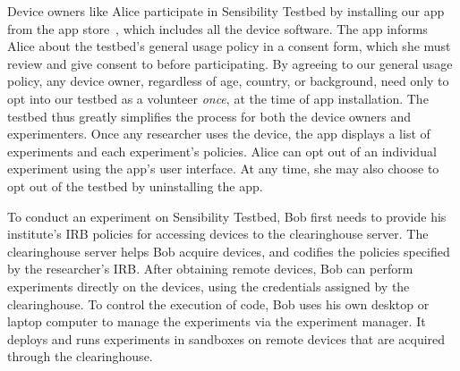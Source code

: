 Device owners like Alice participate in Sensibility Testbed by installing our
app from the app store~\cite{sensibility-app}, which includes all the device 
software. The app informs Alice about the testbed's general usage policy 
in a consent form, which she must review and give consent to before
participating. By agreeing to our general usage policy, any device 
owner, regardless of age, country, or background, need only to opt into our testbed as a
volunteer \textit{once}, at the time of app installation. The testbed thus greatly simplifies the process for both the 
device owners and experimenters. Once any researcher uses the device, the 
app displays a list of experiments and each experiment's policies. 
Alice can opt out of an individual experiment using the
app's user interface. At any time, she may also choose 
to opt out of the testbed by uninstalling the app.

To conduct an experiment on Sensibility Testbed, Bob first 
needs to provide his institute's IRB policies for accessing devices to 
the clearinghouse server.  
The clearinghouse server helps Bob acquire devices, and codifies 
the policies specified by the researcher's IRB. 
After obtaining remote devices, Bob can perform
experiments directly on the devices, using the credentials assigned by
the clearinghouse. 
To control the execution of code, Bob uses his own 
desktop or laptop computer to manage the 
experiments via the experiment manager. It deploys 
and runs experiments in sandboxes on remote devices that are 
acquired through the clearinghouse.


